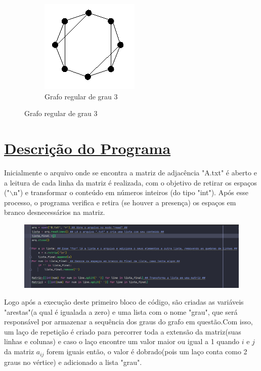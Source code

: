 \documentclass{article}
\begin{document}
\begin{figure}[H]
\begin{subfigure}{0.25\textwidth}
				\includegraphics[width = \textwidth]{"Figuras/regular2"}
				\caption{Grafo regular de grau 3}
				\label{fig:regular2dir}
			\end{subfigure}
		\end{figure}

	\section{{\Large \underline{Descrição do Programa}}}
	
	Inicialmente o arquivo onde se encontra a matriz de adjacência "A.txt" é aberto e a leitura de cada linha da matriz é realizada, com o objetivo de retirar os espaços ("$\backslash$n") e transformar o conteúdo em números inteiros (do tipo "int"). Após esse processo, o programa verifica e retira (se houver a presença) os espaços em branco desnecessários na matriz.
	
	\begin{figure}[H]
		\centering
		\includegraphics[width=0.6\linewidth]{"Figuras/Print1"}
		\label{fig:print1}
		\caption{}
	\end{figure}\vspace*{0.3cm}
	\newpage
	Logo após a execução deste primeiro bloco de código, são criadas as variáveis "arestas"(a qual é igualada a zero) e uma lista com o nome "grau", que será responsável por armazenar a sequência dos graus do grafo em questão.Com isso, um laço de repetição é criado para percorrer toda a extensão da matriz(suas linhas e colunas) e caso o laço encontre um valor maior ou igual a 1 quando $i$ e $j$ da matriz $a_{ij}$ forem iguais então, o valor é dobrado(pois um laço conta como 2 graus no vértice) e adicionado a lista "grau".
	
\end{document}
